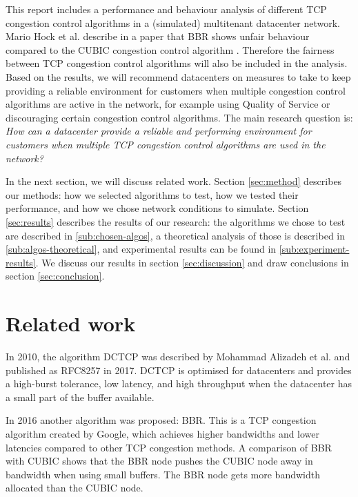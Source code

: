 \documentclass{article}
\begin{document}
This report includes a performance and behaviour analysis of different TCP congestion control algorithms in a (simulated) multitenant datacenter network. Mario Hock et al. describe in a paper that BBR shows unfair behaviour compared to the CUBIC congestion control algorithm \cite{bbr-congestion-comparison}. Therefore the fairness between TCP congestion control algorithms will also be included in the analysis. Based on the results, we will recommend datacenters on measures to take to keep providing a reliable environment for customers when multiple congestion control algorithms are active in the network, for example using Quality of Service or discouraging certain congestion control algorithms. The main research question is: {\it How can a datacenter provide a reliable and performing environment for customers when multiple TCP congestion control algorithms are used in the
network?}

In the next section, we will discuss related work. Section \ref{sec:method}
describes our methods: how we selected algorithms to test, how we tested their
performance, and how we chose network conditions to simulate. Section
\ref{sec:results} describes the results of our research: the algorithms we
chose to test are described in \ref{sub:chosen-algos}, a theoretical analysis
of those is described in \ref{sub:algos-theoretical}, and experimental results
can be found in \ref{sub:experiment-results}. We discuss our results in section
\ref{sec:discussion} and draw conclusions in section \ref{sec:conclusion}.


\section{Related work}

In 2010, the algorithm DCTCP was described by Mohammad Alizadeh et
al.\cite{dctcp-congestion-original} and published as
RFC8257\cite{dctcp-congestion} in 2017. DCTCP is optimised for datacenters and
provides a high-burst tolerance, low latency, and high throughput when the
datacenter has a small part of the buffer available\cite{dctcp-congestion}.

In 2016 another algorithm was proposed: BBR. This is a TCP congestion algorithm
created by Google, which achieves higher bandwidths and lower latencies
compared to other TCP congestion methods\cite{bbr-congestion}. A comparison of
BBR with CUBIC\cite{bbr-congestion-comparison} shows that the BBR node pushes
the CUBIC node away in bandwidth when using small buffers. The BBR node gets
more bandwidth allocated than the CUBIC node.
\end{document}

